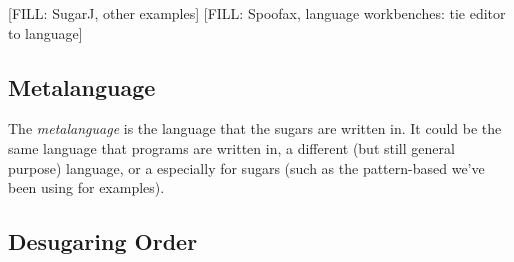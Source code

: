 [FILL: SugarJ, other examples]
[FILL: Spoofax, language workbenches: tie editor to language]


\subsection{Metalanguage}

The \emph{metalanguage} is the language that the sugars are written
in. It could be the same language that programs are written in, a
different (but still general purpose) language, or a 
especially for sugars (such as the pattern-based
  we've been using for examples).


\subsection{Desugaring Order}\label{sec:taxonomy-order}

